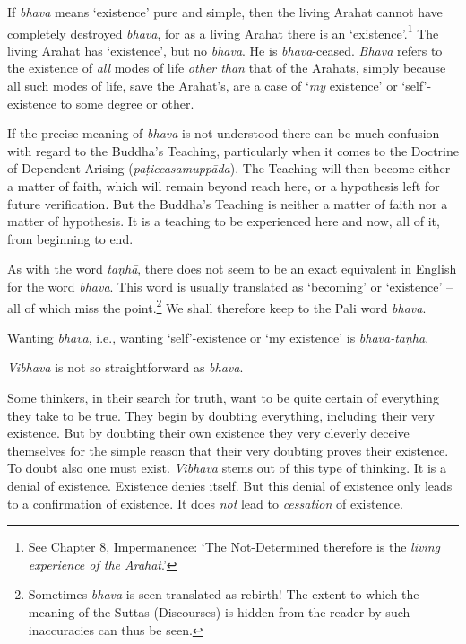 If \textit{bhava} means `existence' pure and simple, then the living Arahat cannot have completely destroyed \textit{bhava}, for as a living Arahat there is an `existence'.\footnote{See \href{ch-08-impermanence.xml\#living-experience}{Chapter 8, Impermanence}: `The Not-Determined therefore is the \emph{living experience of the Arahat}.'} The living Arahat has `existence', but no \textit{bhava}. He is \textit{bhava}-ceased. \textit{Bhava} refers to the existence of \emph{all} modes of life \emph{other than} that of the Arahats, simply because all such modes of life, save the Arahat's, are a case of `\emph{my} existence' or `self'-existence to some degree or other.

If the precise meaning of \textit{bhava} is not understood there can be much confusion with regard to the Buddha's Teaching, particularly when it comes to the Doctrine of Dependent Arising (\textit{paṭiccasamuppāda}). The Teaching will then become either a matter of faith, which will remain beyond reach here, or a hypothesis left for future verification. But the Buddha's Teaching is neither a matter of faith nor a matter of hypothesis. It is a teaching to be experienced here and now, all of it, from beginning to end.

As with the word \textit{taṇhā}, there does not seem to be an exact equivalent in English for the word \textit{bhava}. This word is usually translated as `becoming' or `existence' -- all of which miss the point.\footnote{Sometimes \textit{bhava} is seen translated as rebirth! The extent to which the meaning of the Suttas (Discourses) is hidden from the reader by such inaccuracies can thus be seen.} We shall therefore keep to the Pali word \textit{bhava}.

Wanting \textit{bhava}, i.e., wanting `self'-existence or `my existence' is \textit{bhava-taṇhā}.

\textit{Vibhava} is not so straightforward as \textit{bhava}.

Some thinkers, in their search for truth, want to be quite certain of everything they take to be true. They begin by doubting everything, including their very existence. But by doubting their own existence they very cleverly deceive themselves for the simple reason that their very doubting proves their existence. To doubt also one must exist. \textit{Vibhava} stems out of this type of thinking. It is a denial of existence. Existence denies itself. But this denial of existence only leads to a confirmation of existence. It does \emph{not} lead to \emph{cessation} of existence.

